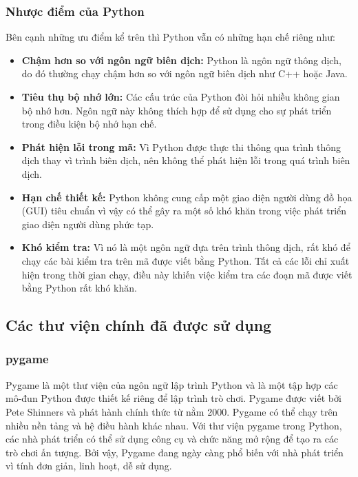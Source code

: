 \documentclass[a4paper]{article}
\begin{document}
\subsubsection{Nhược điểm của Python}
\hspace{15pt}
Bên cạnh những ưu điểm kể trên thì Python vẫn có những hạn chế riêng như:
\begin{itemize}
    \item \textbf{Chậm hơn so với ngôn ngữ biên dịch:} Python là ngôn ngữ thông dịch, do đó thường chạy chậm hơn so với ngôn ngữ biên dịch như C++ hoặc Java.
    \item \textbf{Tiêu thụ bộ nhớ lớn: } Các cấu trúc của Python đòi hỏi nhiều không gian bộ nhớ hơn. Ngôn ngữ này không thích hợp để sử dụng cho sự phát triển trong điều kiện bộ nhớ hạn chế.
    \item \textbf{Phát hiện lỗi trong mã: } Vì Python được thực thi thông qua trình thông dịch thay vì trình biên dịch, nên không thể phát hiện lỗi trong quá trình biên dịch.
    \item \textbf{Hạn chế thiết kế: } Python không cung cấp một giao diện người dùng đồ họa (GUI) tiêu chuẩn vì vậy có thể gây ra một số khó khăn trong việc phát triển giao diện người dùng phức tạp.
    \item \textbf{Khó kiểm tra: } Vì nó là một ngôn ngữ dựa trên trình thông dịch, rất khó để chạy các bài kiểm tra trên mã được viết bằng Python. Tất cả các lỗi chỉ xuất hiện trong thời gian chạy, điều này khiến việc kiểm tra các đoạn mã được viết bằng Python rất khó khăn.
\end{itemize}

\subsection{Các thư viện chính đã được sử dụng}
\subsubsection{pygame}
\begin{par}
    Pygame là một thư viện của ngôn ngữ lập trình Python và là một tập hợp các mô-đun Python được thiết kế riêng để lập trình trò chơi. Pygame được viết bởi Pete Shinners và phát hành chính thức từ nằm 2000. Pygame có thể chạy trên nhiều nền tảng và hệ điều hành khác nhau. Với thư viện pygame trong Python, các nhà phát triển có thể sử dụng công cụ và chức năng mở rộng để tạo ra các trò chơi ấn tượng. Bởi vậy, Pygame đang ngày càng phổ biến với nhà phát triển vì tính đơn giản, linh hoạt, dễ sử dụng.
\end{par}
\end{document}
